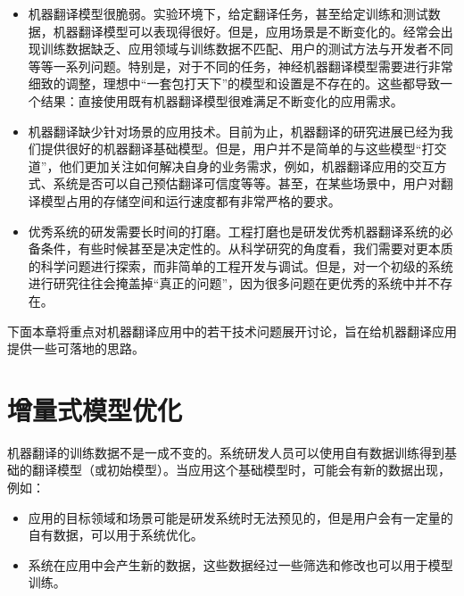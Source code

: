\begin{itemize}
\vspace{0.5em}
\item 机器翻译模型很脆弱。实验环境下，给定翻译任务，甚至给定训练和测试数据，机器翻译模型可以表现得很好。但是，应用场景是不断变化的。经常会出现训练数据缺乏、应用领域与训练数据不匹配、用户的测试方法与开发者不同等等一系列问题。特别是，对于不同的任务，神经机器翻译模型需要进行非常细致的调整，理想中“一套包打天下”的模型和设置是不存在的。这些都导致一个结果：直接使用既有机器翻译模型很难满足不断变化的应用需求。

\vspace{0.5em}
\item 机器翻译缺少针对场景的应用技术。目前为止，机器翻译的研究进展已经为我们提供很好的机器翻译基础模型。但是，用户并不是简单的与这些模型“打交道”，他们更加关注如何解决自身的业务需求，例如，机器翻译应用的交互方式、系统是否可以自己预估翻译可信度等等。甚至，在某些场景中，用户对翻译模型占用的存储空间和运行速度都有非常严格的要求。

\vspace{0.5em}
\item 优秀系统的研发需要长时间的打磨。工程打磨也是研发优秀机器翻译系统的必备条件，有些时候甚至是决定性的。从科学研究的角度看，我们需要对更本质的科学问题进行探索，而非简单的工程开发与调试。但是，对一个初级的系统进行研究往往会掩盖掉“真正的问题”，因为很多问题在更优秀的系统中并不存在。
\vspace{0.5em}
\end{itemize}

\parinterval 下面本章将重点对机器翻译应用中的若干技术问题展开讨论，旨在给机器翻译应用提供一些可落地的思路。


\section{增量式模型优化}

\parinterval 机器翻译的训练数据不是一成不变的。系统研发人员可以使用自有数据训练得到基础的翻译模型（或初始模型）。当应用这个基础模型时，可能会有新的数据出现，例如：

\begin{itemize}
\vspace{0.5em}
\item 应用的目标领域和场景可能是研发系统时无法预见的，但是用户会有一定量的自有数据，可以用于系统优化。
\vspace{0.5em}
\item 系统在应用中会产生新的数据，这些数据经过一些筛选和修改也可以用于模型训练。
\vspace{0.5em}
\end{itemize}

